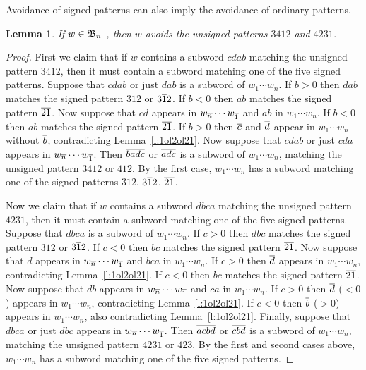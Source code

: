 \documentclass[11pt]{article}
\newtheorem{lem}[theo]{Lemma}
\theoremstyle{definition}
\numberwithin{equation}{section}
\begin{document}
Avoidance of signed patterns can also imply the avoidance of ordinary patterns.
\begin{lem}\label{l:5signedp}
  If $w \in \mathfrak{B}_n$ \avoidssignedp, then $w$ avoids the unsigned patterns
  $3412$ and $4231$.
\end{lem}
\begin{proof}
  First we claim that if $w$ contains a subword $cdab$
  matching the unsigned pattern $3412$, then it must contain a subword
  matching one of the five signed patterns.
  Suppose that $cdab$ or just $dab$ is a subword of $w_1 \cdots w_n$.
  If $b>0$ then $dab$ matches the signed pattern $312$ or $3\overline{1}2$.
  If $b<0$ then $ab$ matches the signed pattern $\overline{2}\overline{1}$.
  Now suppose that $cd$ appears in $w_{\overline{n}} \cdots w_{\overline{1}}$
  and $ab$ in $w_1 \cdots w_n$.
  If $b<0$ then $ab$ matches the signed pattern $\overline{2}\overline{1}$.
  If $b>0$ then $\overline{c}$ and $\overline{d}$ appear in $w_1 \cdots w_n$ without $\overline{b}$,
  contradicting Lemma~\ref{l:1ol2ol21}.
  Now suppose that $cdab$ or just $cda$
  appears in $w_{\overline{n}} \cdots w_{\overline{1}}$.
  Then $\overline{badc}$ or $\overline{adc}$
  is a subword of $w_1 \cdots w_n$, matching the unsigned pattern
  $3412$ or $412$.  By the first case, $w_1 \cdots w_n$
  has a subword matching one of the signed patterns
  $312$, $3 \overline{1} 2$, $\overline{2}\overline{1}$.

  Now we claim that if $w$ contains a subword $dbca$
  matching the unsigned pattern $4231$, then it must contain a subword
  matching one of the five signed patterns.
  Suppose that $dbca$ is a subword of $w_1 \cdots w_n$.
  If $c > 0$ then $dbc$ matches the signed pattern $312$ or $3\overline{1}2$.
  If $c < 0$ then $bc$ matches the signed pattern $\overline{2}\overline{1}$.
  Now suppose that $d$ appears in $w_{\overline{n}} \cdots w_{\overline{1}}$
  and $bca$ in $w_1 \cdots w_n$.  If $c > 0$ then $\overline{d}$
  appears in $w_1 \cdots w_n$, contradicting Lemma~\ref{l:1ol2ol21}.
  If $c < 0$ then $bc$ matches the signed pattern $\overline{2}\overline{1}$.
  Now suppose that $db$ appears in $w_{\overline{n}} \cdots w_{\overline{1}}$
  and $ca$ in $w_1 \cdots w_n$.
  If $c > 0$ then $\overline{d}$ ($<0$) appears in $w_1 \cdots w_n$,
  contradicting Lemma~\ref{l:1ol2ol21}.
  If $c < 0$ then $\overline{b}$ ($>0$) appears in $w_1 \cdots w_n$,
  also contradicting Lemma~\ref{l:1ol2ol21}.
  Finally, suppose that $dbca$ or just $dbc$
  appears in $w_{\overline{n}} \cdots w_{\overline{1}}$.
  Then $\overline{acbd}$ or $\overline{cbd}$
  is a subword of $w_1 \cdots w_n$, matching the unsigned pattern
  $4231$ or $423$.  By the first and second cases above, $w_1 \cdots w_n$
  has a subword matching one of the five signed patterns.
\end{proof}
\end{document}
